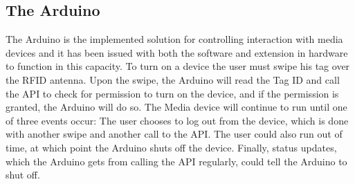 \subsection*{The Arduino}
The Arduino is the implemented solution for controlling interaction with media devices and it has been issued with both the software and extension in hardware to function in this capacity.
To turn on a device the user must swipe his tag over the RFID antenna.
Upon the swipe, the Arduino will read the Tag ID and call the API to check for permission to turn on the device, and if the permission is granted, the Arduino will do so.
The Media device will continue to run until one of three events occur: The user chooses to log out from the device, which is done with another swipe and another call to the API. The user could also run out of time, at which point the Arduino shuts off the device. Finally, status updates, which the Arduino gets from calling the API regularly, could tell the Arduino to shut off.